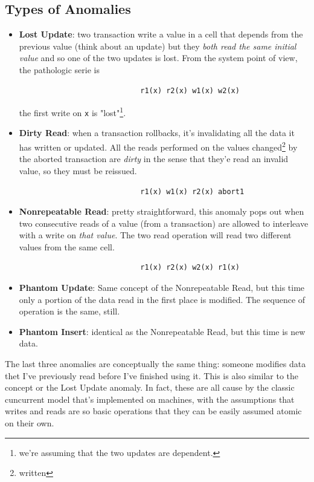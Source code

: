 \documentclass{article}
\begin{document}
			\subsection{Types of Anomalies}
				\begin{itemize}
					\item \textbf{Lost Update}: two transaction write a value in a cell that depends from the previous value (think about an update) but they \textit{both read the same initial value} and so one of the two updates is lost. From the system point of view, the pathologic serie is
						\begin{verbatim}
							r1(x) r2(x) w1(x) w2(x)
						\end{verbatim}
						the first write on \verb|x| is "lost"\footnote{we're assuming that the two updates are dependent.}.
					
					\item \textbf{Dirty Read}: when a transaction rollbacks, it's invalidating all the data it has written or updated. All the reads performed on the values changed\footnote{written} by the aborted transaction are \textit{dirty} in the sense that they'e read an invalid value, so they must be reissued.
						\begin{verbatim}
							r1(x) w1(x) r2(x) abort1 
						\end{verbatim}
					
					\item \textbf{Nonrepeatable Read}: pretty straightforward, this anomaly pops out when two consecutive reads of a value (from a transaction) are allowed to interleave with a write on \textit{that value}. The two read operation will read two different values from the same cell. 
						\begin{verbatim}
							r1(x) r2(x) w2(x) r1(x)
						\end{verbatim}

					\item \textbf{Phantom Update}: Same concept of the Nonrepeatable Read, but this time only a portion of the data read in the first place is modified. The sequence of operation is the same, still.
					\item \textbf{Phantom Insert}: identical as the Nonrepeatable Read, but this time is new data.
				\end{itemize}
				The last three anomalies are conceptually the same thing: someone modifies data thet I've previously read before I've finished using it. This is also similar to the concept or the Lost Update anomaly. In fact, these are all cause by the classic cuncurrent model that's implemented on machines, with the assumptions that writes and reads are so basic operations that they can be easily assumed atomic on their own.
\end{document}
